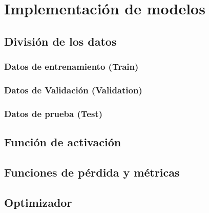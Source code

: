 \chapter{Implementación de modelos}\label{ch:ImpModelos}
\section{División de los datos}

\subsection{Datos de entrenamiento (Train)}

\subsection{Datos de Validación (Validation)}

\subsection{Datos de prueba (Test)}


\section{Función de activación}

\section{Funciones de pérdida y métricas}

\section{Optimizador}